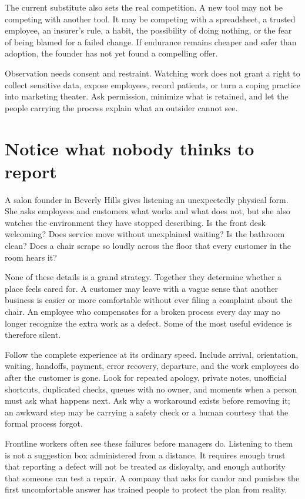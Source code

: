 The current substitute also sets the real competition. A new tool may not be
competing with another tool. It may be competing with a spreadsheet, a trusted
employee, an insurer's rule, a habit, the possibility of doing nothing, or the
fear of being blamed for a failed change. If endurance remains cheaper and
safer than adoption, the founder has not yet found a compelling offer.

Observation needs consent and restraint. Watching work does not grant a right
to collect sensitive data, expose employees, record patients, or turn a coping
practice into marketing theater. Ask permission, minimize what is retained,
and let the people carrying the process explain what an outsider cannot see.

\section{Notice what nobody thinks to report}

A salon founder in Beverly Hills gives listening an unexpectedly physical
form. She asks employees and customers what works and what does not, but she
also watches the environment they have stopped describing. Is the front desk
welcoming? Does service move without unexplained waiting? Is the bathroom
clean? Does a chair scrape so loudly across the floor that every customer in
the room hears it?

None of these details is a grand strategy. Together they determine whether a
place feels cared for. A customer may leave with a vague sense that another
business is easier or more comfortable without ever filing a complaint about
the chair. An employee who compensates for a broken process every day may no
longer recognize the extra work as a defect. Some of the most useful evidence
is therefore silent.

Follow the complete experience at its ordinary speed. Include arrival,
orientation, waiting, handoffs, payment, error recovery, departure, and the
work employees do after the customer is gone. Look for repeated apology,
private notes, unofficial shortcuts, duplicated checks, queues with no owner,
and moments when a person must ask what happens next. Ask why a workaround
exists before removing it; an awkward step may be carrying a safety check or a
human courtesy that the formal process forgot.

Frontline workers often see these failures before managers do. Listening to
them is not a suggestion box administered from a distance. It requires enough
trust that reporting a defect will not be treated as disloyalty, and enough
authority that someone can test a repair. A company that asks for candor and
punishes the first uncomfortable answer has trained people to protect the plan
from reality.

